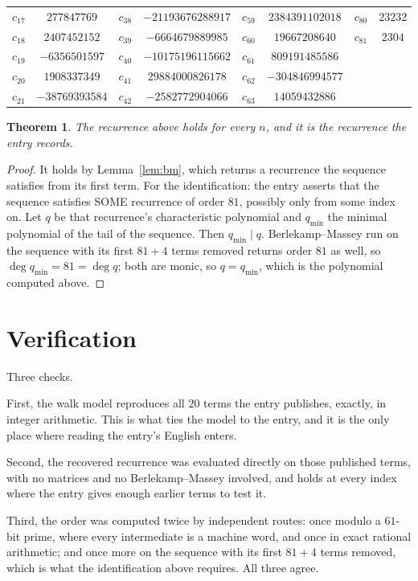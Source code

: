 \documentclass[11pt,a4paper]{article}
\theoremstyle{plain}
\newtheorem{theorem}{Theorem}
\theoremstyle{definition}
\begin{document}
\begin{center}
\begin{tabular}{cccccccc}
$c_{17}$ & $277847769$ & $c_{38}$ & $-21193676288917$ & $c_{59}$ & $2384391102018$ & $c_{80}$ & $23232$ \\
$c_{18}$ & $2407452152$ & $c_{39}$ & $-6664679889985$ & $c_{60}$ & $19667208640$ & $c_{81}$ & $2304$ \\
$c_{19}$ & $-6356501597$ & $c_{40}$ & $-10175196115662$ & $c_{61}$ & $809191485586$ &  &  \\
$c_{20}$ & $1908337349$ & $c_{41}$ & $29884000826178$ & $c_{62}$ & $-304846994577$ &  &  \\
$c_{21}$ & $-38769393584$ & $c_{42}$ & $-2582772904066$ & $c_{63}$ & $14059432886$ &  &  \\
\end{tabular}
\end{center}

\begin{theorem}
The recurrence above holds for every $n$, and it is the recurrence the entry records.
\end{theorem}

\begin{proof}
It holds by Lemma~\ref{lem:bm}, which returns a recurrence the sequence satisfies from its
first term. For the identification: the entry asserts that the sequence satisfies SOME
recurrence of order $81$, possibly only from some index on. Let $q$ be that recurrence's
characteristic polynomial and $q_{\min}$ the minimal polynomial of the tail of the sequence.
Then $q_{\min}\mid q$. Berlekamp--Massey run on the sequence with its first $81+4$ terms
removed returns order $81$ as well, so $\deg q_{\min}=81=\deg q$; both are monic, so
$q=q_{\min}$, which is the polynomial computed above.
\end{proof}

\section{Verification}

Three checks.

First, the walk model reproduces all $20$ terms the entry publishes, exactly, in integer
arithmetic. This is what ties the model to the entry, and it is the only place where reading
the entry's English enters.

Second, the recovered recurrence was evaluated directly on those published terms, with no
matrices and no Berlekamp--Massey involved, and holds at every index where the entry gives
enough earlier terms to test it.

Third, the order was computed twice by independent routes: once modulo a $61$-bit prime, where
every intermediate is a machine word, and once in exact rational arithmetic; and once more on
the sequence with its first $81+4$ terms removed, which is what the identification above
requires. All three agree.
\end{document}
